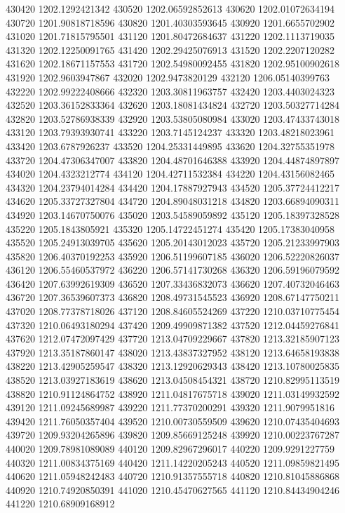 {430420 1202.1292421342
430520 1202.06592852613
430620 1202.01072634194
430720 1201.90818718596
430820 1201.40303593645
430920 1201.6655702902
431020 1201.71815795501
431120 1201.80472684637
431220 1202.1113719035
431320 1202.12250091765
431420 1202.29425076913
431520 1202.2207120282
431620 1202.18671157553
431720 1202.54980092455
431820 1202.95100902618
431920 1202.9603947867
432020 1202.9473820129
432120 1206.05140399763
432220 1202.99222408666
432320 1203.30811963757
432420 1203.4403024323
432520 1203.36152833364
432620 1203.18081434824
432720 1203.50327714284
432820 1203.52786938339
432920 1203.53805080984
433020 1203.47433743018
433120 1203.79393930741
433220 1203.7145124237
433320 1203.48218023961
433420 1203.6787926237
433520 1204.25331449895
433620 1204.32755351978
433720 1204.47306347007
433820 1204.48701646388
433920 1204.44874897897
434020 1204.4323212774
434120 1204.42711532384
434220 1204.43156082465
434320 1204.23794014284
434420 1204.17887927943
434520 1205.37724412217
434620 1205.33727327804
434720 1204.89048031218
434820 1203.66894090311
434920 1203.14670750076
435020 1203.54589059892
435120 1205.18397328528
435220 1205.1843805921
435320 1205.14722451274
435420 1205.17383040958
435520 1205.24913039705
435620 1205.20143012023
435720 1205.21233997903
435820 1206.40370192253
435920 1206.51199607185
436020 1206.52220826037
436120 1206.55460537972
436220 1206.57141730268
436320 1206.59196079592
436420 1207.63992619309
436520 1207.33436832073
436620 1207.40732046463
436720 1207.36539607373
436820 1208.49731545523
436920 1208.67147750211
437020 1208.77378718026
437120 1208.84605524269
437220 1210.03710775454
437320 1210.06493180294
437420 1209.49909871382
437520 1212.04459276841
437620 1212.07472097429
437720 1213.04709229667
437820 1213.32185907123
437920 1213.35187860147
438020 1213.43837327952
438120 1213.64658193838
438220 1213.42905259547
438320 1213.12920629343
438420 1213.10780025835
438520 1213.03927183619
438620 1213.04508454321
438720 1210.82995113519
438820 1210.91124864752
438920 1211.04817675718
439020 1211.03149932592
439120 1211.09245689987
439220 1211.77370200291
439320 1211.9079951816
439420 1211.76050357404
439520 1210.00730559509
439620 1210.07435404693
439720 1209.93204265896
439820 1209.85669125248
439920 1210.00223767287
440020 1209.78981089089
440120 1209.82967296017
440220 1209.9291227759
440320 1211.00834375169
440420 1211.14220205243
440520 1211.09859821495
440620 1211.05948242483
440720 1210.91357555718
440820 1210.81045886868
440920 1210.74920850391
441020 1210.45470627565
441120 1210.84434904246
441220 1210.68909168912
}
